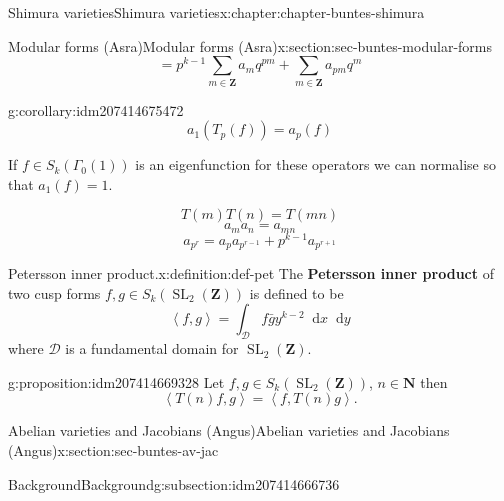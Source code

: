 \documentclass[oneside,10pt,]{book}
\newcommand{\terminology}[1]{\textbf{#1}}
\numberwithin{equation}{section}
\newcommand{\diff}{\mathop{}\!\mathrm{d}}
\newcommand{\pair}[2]{\left\langle #1, #2 \right\rangle}
\newcommand{\NN}{\mathbf{N}}
\newcommand{\ZZ}{\mathbf{Z}}
\DeclareMathOperator{\SL}{SL}
\begin{document}
\begin{chapterptx}{Shimura varieties}{}{Shimura varieties}{}{}{x:chapter:chapter-buntes-shimura}
\begin{sectionptx}{Modular forms (Asra)}{}{Modular forms (Asra)}{}{}{x:section:sec-buntes-modular-forms}
\begin{equation*}
\end{equation*}
%
\begin{equation*}
= p^{k-1} \sum_{m\in \ZZ} a_m q^{pm} +\sum_{m\in \ZZ} a_{pm}q^m
\end{equation*}
%
\begin{corollary}{}{}{g:corollary:idm207414675472}%
%
\begin{equation*}
a_1(T_p(f)) = a_p(f)
\end{equation*}
%
\end{corollary}
If \(f\in S_k(\Gamma_0(1))\) is an eigenfunction for these operators we can normalise so that \(a_1(f) = 1\).%
\par
%
\begin{equation*}
T(m)T(n) = T(mn)
\end{equation*}
%
\begin{equation*}
a_ma_n = a_{mn}
\end{equation*}
%
\begin{equation*}
a_{p^r} = a_p a_{p^{r-1}} + p^{k-1} a_{p^{r+1}}
\end{equation*}
%
\begin{definition}{Petersson inner product.}{x:definition:def-pet}%
The \terminology{Petersson inner product} of two cusp forms \(f,g\in S_k(\SL_2(\ZZ))\) is defined to be%
\begin{equation*}
\pair{f}{g} = \int_{\mathcal D} f \bar g y^{k-2} \diff x \diff y
\end{equation*}
where \(\mathcal D\) is a fundamental domain for \(\SL_2(\ZZ)\).%
\end{definition}
\begin{proposition}{}{}{g:proposition:idm207414669328}%
Let \(f,g\in S_k(\SL_2(\ZZ))\), \(n\in \NN\) then%
\begin{equation*}
\pair{T(n) f}{g} = \pair{f}{T(n)g}\text{.}
\end{equation*}
%
\end{proposition}
\end{sectionptx}
%
%
\typeout{************************************************}
\typeout{************************************************}
%
\begin{sectionptx}{Abelian varieties and Jacobians (Angus)}{}{Abelian varieties and Jacobians (Angus)}{}{}{x:section:sec-buntes-av-jac}
%
%
\typeout{************************************************}
\typeout{************************************************}
%
\begin{subsectionptx}{Background}{}{Background}{}{}{g:subsection:idm207414666736}

\end{subsectionptx}
\end{sectionptx}
\end{chapterptx}
\end{document}
